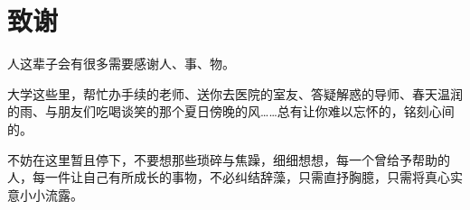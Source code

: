 \renewcommand{\headrulewidth}{0.5pt} %
\section*{\heiti {} \textbf{致\quad 谢}}
\kai {}
人这辈子会有很多需要感谢人、事、物。

大学这些里，帮忙办手续的老师、送你去医院的室友、答疑解惑的导师、春天温润的雨、与朋友们吃喝谈笑的那个夏日傍晚的风……总有让你难以忘怀的，铭刻心间的。

不妨在这里暂且停下，不要想那些琐碎与焦躁，细细想想，每一个曾给予帮助的人，每一件让自己有所成长的事物，不必纠结辞藻，只需直抒胸臆，只需将真心实意小小流露。
















